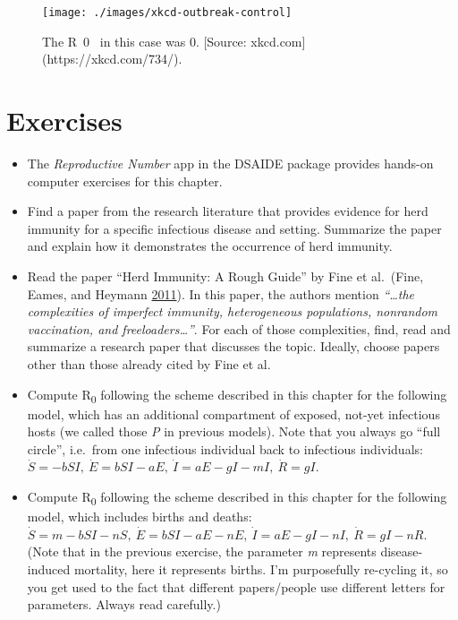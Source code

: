 \documentclass[
]{book}
\providecommand{\tightlist}{%
  \setlength{\itemsep}{0pt}\setlength{\parskip}{0pt}}
\begin{document}
\begin{figure}
\texttt{[image: ./images/xkcd-outbreak-control]} \caption{The R~0~ in this case was 0. [Source: xkcd.com](https://xkcd.com/734/).}\label{fig:xkcd-outbreak-control}
\end{figure}

\hypertarget{exercises-3}{%
\section{Exercises}\label{exercises-3}}

\begin{itemize}
\tightlist
\item
  The \emph{Reproductive Number} app in the DSAIDE package provides hands-on computer exercises for this chapter.
\item
  Find a paper from the research literature that provides evidence for herd immunity for a specific infectious disease and setting. Summarize the paper and explain how it demonstrates the occurrence of herd immunity.
\item
  Read the paper ``Herd Immunity: A Rough Guide'' by Fine et al.~(Fine, Eames, and Heymann \protect\hyperlink{ref-fine11}{2011}). In this paper, the authors mention \emph{``\ldots the complexities of imperfect immunity, heterogeneous populations, nonrandom vaccination, and freeloaders\ldots{}''}. For each of those complexities, find, read and summarize a research paper that discusses the topic. Ideally, choose papers other than those already cited by Fine et al.~
\item
  Compute R\textsubscript{0} following the scheme described in this chapter for the following model, which has an additional compartment of exposed, not-yet infectious hosts (we called those \emph{P} in previous models). Note that you always go ``full circle'', i.e.~from one infectious individual back to infectious individuals: \(\dot S = -b SI, \ \dot E = b S I - a E, \ \dot I = a E - g I - m I, \ \dot R = g I\).
\item
  Compute R\textsubscript{0} following the scheme described in this chapter for the following model, which includes births and deaths:
  \(\dot S =m - b SI - n S, \ \dot E = b S I - a E - n E, \ \dot I = a E - g I - n I, \ \dot R = g I - n R\). (Note that in the previous exercise, the parameter \emph{m} represents disease-induced mortality, here it represents births. I'm purposefully re-cycling it, so you get used to the fact that different papers/people use different letters for parameters. Always read carefully.)
\end{itemize}
\end{document}
